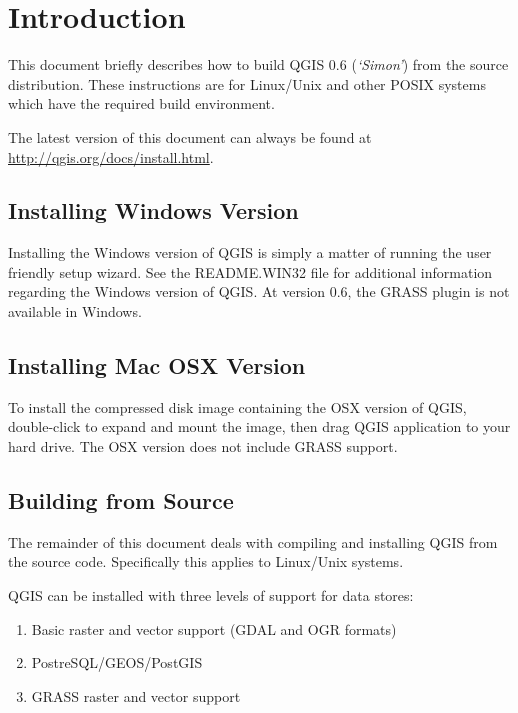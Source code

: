 
\section{Introduction}\label{label_introduction}
This document briefly describes how to build QGIS 0.6 (\textit{`Simon'}) from the source distribution. These instructions are for Linux/Unix and other POSIX systems which have the required build environment.

The latest version of this document can always be found at \url{http://qgis.org/docs/install.html}.
\subsection{Installing Windows Version}
Installing the Windows version of QGIS is simply a matter of running the user friendly setup wizard. See the README.WIN32 file for additional information regarding the Windows version of QGIS. At version 0.6, the GRASS plugin is not available in Windows.
\subsection{Installing Mac OSX Version}
To install the compressed disk image containing the OSX version of QGIS,
double-click to expand and mount the image, then drag QGIS application to your
hard drive. The OSX version does not include GRASS support.


\subsection{Building from Source}
The remainder of this document deals with compiling and installing QGIS from the
source code. Specifically this applies to Linux/Unix systems.


QGIS can be installed with three levels of support for data stores:
\begin{enumerate}
\item Basic raster and vector support (GDAL and OGR formats)
\item PostreSQL/GEOS/PostGIS 
\item GRASS raster and vector support
\end{enumerate} 

